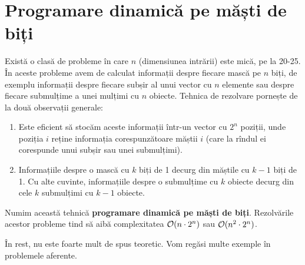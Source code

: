 \documentclass[../main.tex]{subfiles}
\begin{document}
\section{Programare dinamică pe măști de biți}

Există o clasă de probleme în care $n$ (dimensiunea intrării) este mică, pe la 20-25. În aceste probleme avem de calculat informații despre fiecare mască pe $n$ biți, de exemplu informații despre fiecare subșir al unui vector cu $n$ elemente sau despre fiecare submulțime a unei mulțimi cu $n$ obiecte. Tehnica de rezolvare pornește de la două observații generale:

\begin{enumerate}
  \item Este eficient să stocăm aceste informații într-un vector cu $2^n$ poziții, unde poziția $i$ reține informația corespunzătoare măștii $i$ (care la rîndul ei corespunde unui subșir sau unei submulțimi).
  \item Informațiile despre o mască cu $k$ biți de 1 decurg din măștile cu $k-1$ biți de 1. Cu alte cuvinte, informațiile despre o submulțime cu $k$ obiecte decurg din cele $k$ submulțimi cu $k-1$ obiecte.
\end{enumerate}

Numim această tehnică \textbf{programare dinamică pe măști de biți}. Rezolvările acestor probleme tind să aibă complexitatea $\mathcal{O}(n \cdot 2^n)$ sau $\mathcal{O}(n^2 \cdot 2^n)$.

În rest, nu este foarte mult de spus teoretic. Vom regăsi multe exemple în problemele aferente.
\end{document}
